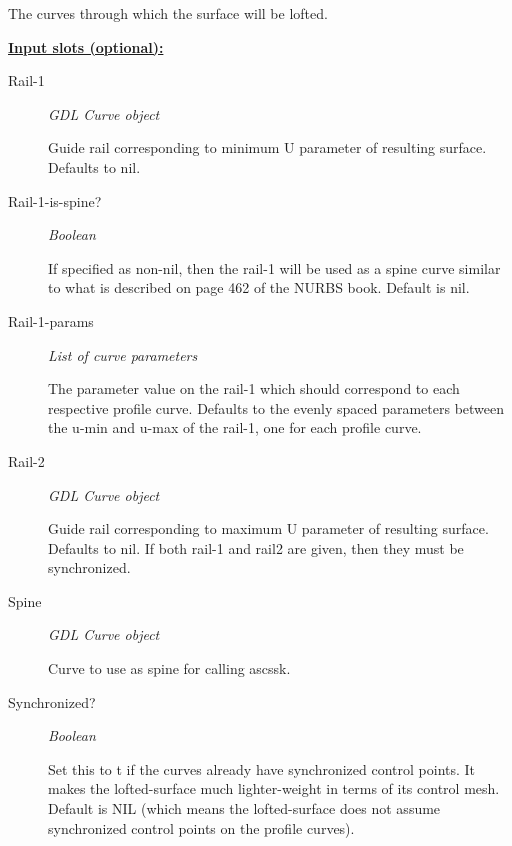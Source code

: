 \documentclass [11pt]{book}
\begin{document}
\begin{itemize}
\begin{description}
 The curves through which the surface will be lofted.




\end{description}






\textbf{
\underline{Input slots (optional):}}

\begin{description}

\item [Rail-1]
\emph{GDL Curve object}

 Guide rail corresponding to minimum U parameter of
resulting surface. Defaults to nil.




\item [Rail-1-is-spine?]
\emph{Boolean}

 If specified as non-nil, then the rail-1 will be used
as a spine curve similar to what is described on page 462 of the NURBS book.
Default is nil.




\item [Rail-1-params]
\emph{List of curve parameters}

 The parameter value on the rail-1 which
should correspond to each respective profile curve. Defaults to the evenly
spaced parameters between the u-min and u-max of the rail-1, one for each
profile curve.




\item [Rail-2]
\emph{GDL Curve object}

 Guide rail corresponding to maximum U parameter
of resulting surface. Defaults to nil. If both rail-1 and rail2 are given,
then they must be synchronized.




\item [Spine]
\emph{GDL Curve object}

 Curve to use as spine for calling ascssk.




\item [Synchronized?]
\emph{Boolean}

 Set this to t if the curves already have synchronized control points.
It makes the lofted-surface much lighter-weight in terms of its control mesh.
Default is NIL (which means the lofted-surface does not assume synchronized
control points on the profile curves).





\end{description}
\end{itemize}
\end{document}
